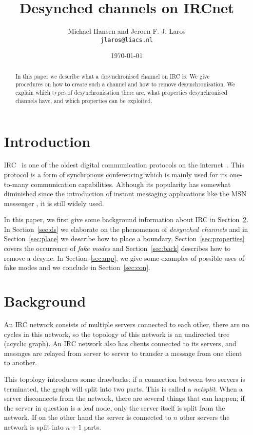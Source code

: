 \documentclass{article}
\title{\Huge Desynched channels on IRCnet}
\author{Michael Hansen and Jeroen F. J. Laros\\
        \texttt{jlaros@liacs.nl}}
\date{\today}
\theoremstyle{definition}
\begin{document}
\maketitle

\begin{abstract} \noindent
In this paper we describe what a desynchronised channel on IRC is. We give
procedures on how to create such a channel and how to remove desynchronisation.
We explain which types of desynchronisation there are, what properties
desynchronised channels have, and which properties can be exploited.
\end{abstract}

\section{Introduction} \label{sec:intro}
IRC~\cite{IRC} is one of the oldest digital communication protocols on the
internet~\cite{IN}. This protocol is a form of synchronous conferencing which
is mainly used for its one-to-many communication capabilities. Although its
popularity has somewhat diminished since the introduction of instant messaging
applications \cite{IM} like the MSN messenger \cite{MSN}, it is still widely
used.

In this paper, we first give some background information about IRC in
Section~\ref{sec:bg}. In Section~\ref{sec:ds} we elaborate on the phenomenon of
\emph{desynched channels} and in Section~\ref{sec:place} we describe how to
place a boundary, Section~\ref{sec:properties} covers the occurrence of
\emph{fake modes} and Section~\ref{sec:back} describes how to remove a desync.
In Section~\ref{sec:app}, we give some examples of possible uses of fake modes
and we conclude in Section~\ref{sec:con}.

\section{Background} \label{sec:bg}
An IRC network consists of multiple servers connected to each other, there are
no cycles in this network, so the topology of this network is an undirected
tree (acyclic graph). An IRC network also has clients connected to its servers,
and messages are relayed from server to server to transfer a message from one
client to another.

This topology introduces some drawbacks; if a connection between two servers is
terminated, the graph will split into two parts. This is called a
\emph{netsplit}. When a server disconnects from the network, there are several
things that can happen; if the server in question is a leaf node, only the
server itself is split from the network. If on the other hand the server is
connected to $n$ other servers the network is split into $n + 1$ parts.
\end{document}
